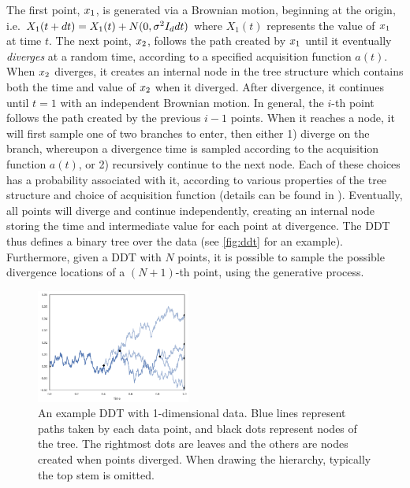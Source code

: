 The first point, $x_1$, is generated
via a Brownian motion, beginning at the origin, i.e.
$X_1(t + dt) = X_1(t) + N(0, \sigma^2I_ddt)$
where $X_1(t)$ represents the value of $x_1$ at time $t$.
The next point, $x_2$, follows the path created
by $x_1$ until
it eventually \emph{diverges}
at a random time, according to a specified
acquisition function $a(t)$.
When $x_2$ diverges, it creates
an internal node in the tree structure
which contains both the time and value of $x_2$
when it diverged.
After divergence, it continues until $t = 1$ with 
an independent Brownian motion.
In general, the $i$-th point
follows the path created by the 
previous $i - 1$ points.
When it reaches a node, it
will first sample one of two branches
to enter, then
either 1) diverge on the branch,
whereupon a divergence time is sampled
according to the acquisition function $a(t)$,
or 2) recursively continue to the next node.
Each of these choices has a probability
associated with it, according to various properties
of the tree structure and choice of acquisition function
(details can be found in \citet{Neal2003}).
Eventually, all points will diverge and continue independently,
creating an internal node storing the time and
intermediate value for each point at divergence.
The DDT thus defines a binary tree over the data
(see \autoref{fig:ddt} for an example).
Furthermore, given a DDT with $N$ points,
it is possible to sample the possible divergence
locations of a $(N + 1)$-th point, using
the generative process. 

\begin{figure}[h]
    \centering
    \includegraphics[width=0.45\textwidth]{img/ibhc/ddt}
    \caption{An example DDT with 1-dimensional data. Blue lines represent paths
    taken by each data point, and black dots represent nodes of the tree.
    The rightmost dots are leaves and the others are nodes
    created when points diverged. When drawing the hierarchy,
    typically the top stem is omitted.}
    \label{fig:ddt}
\end{figure}


